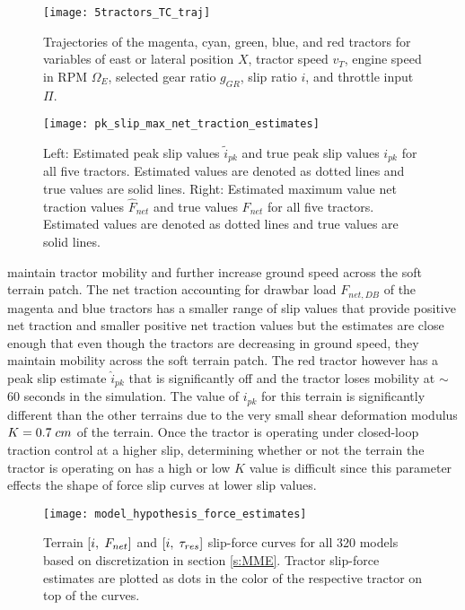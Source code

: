 \begin{figure}[htb]
    \centering
    \texttt{[image: 5tractors\_TC\_traj]}
    \vspace{-20pt}
    \caption{Trajectories of the magenta, cyan, green, blue, and red tractors for variables of east or lateral position $X$, tractor speed $v_T$, engine speed in RPM $\Omega_E$, selected gear ratio $g_{GR}$, slip ratio $i$, and throttle input $\Pi$.}
    \label{fig:5tractors_TC_traj}
\end{figure}
\begin{figure}[htb]
    \centering
    \texttt{[image: pk\_slip\_max\_net\_traction\_estimates]}
    \caption{Left: Estimated peak slip values $\tilde{i}_{pk}$ and true peak slip values $i_{pk}$ for all five tractors. Estimated values are denoted as dotted lines and true values are solid lines.  Right: Estimated maximum value net traction values $\hat{F}_{net}$ and true values $F_{net}$ for all five tractors. Estimated values are denoted as dotted lines and true values are solid lines. }
    \label{fig:pk_slip_max_net_traction_estimates}
\end{figure}
maintain tractor mobility and further increase ground speed across the soft terrain patch. The net traction accounting for drawbar load $F_{net,DB}$ of the magenta and blue tractors has a smaller range of slip values that provide positive net traction and smaller positive net traction values but the estimates are close enough that even though the tractors are decreasing in ground speed, they maintain mobility across the soft terrain patch. The red tractor however has a peak slip estimate $\hat{i}_{pk}$ that is significantly off and the tractor loses mobility at $\sim$ 60 seconds in the simulation. The value of $i_{pk}$ for this terrain is significantly different than the other terrains due to the very small shear deformation modulus $K=0.7\hspace{1mm}cm$ of the terrain. Once the tractor is operating under closed-loop traction control at a higher slip, determining whether or not the terrain the tractor is operating on has a high or low $K$ value is difficult since this parameter effects the shape of force slip curves at lower slip values. 
\begin{figure}[htb]
    \centering
    \texttt{[image: model\_hypothesis\_force\_estimates]}
    \caption{Terrain $[i,\hspace{1mm}F_{net}]$ and $[i,\hspace{1mm}\tau_{res}]$ slip-force curves for all 320 models based on discretization in section \ref{s:MME}. Tractor slip-force estimates are plotted as dots in the color of the respective tractor on top of the curves.}
    \label{fig:model_hypothesis_force_estimates}
\end{figure}
